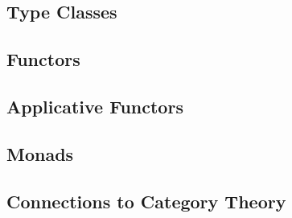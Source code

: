 \documentclass[thesis.tex]{subfiles}
\begin{document}
\subsection{Type Classes}

\subsection{Functors}

\subsection{Applicative Functors}

\subsection{Monads}

\subsection{Connections to Category Theory}
\end{document}
